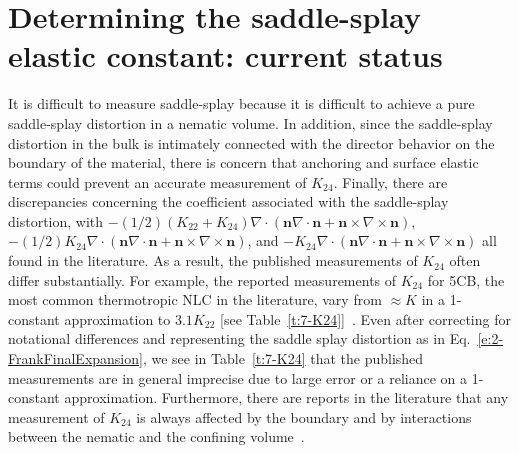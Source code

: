 \section{Determining the saddle-splay elastic constant: current status}
It is difficult to measure saddle-splay because it is difficult to achieve a pure saddle-splay distortion in a nematic volume.
In addition, since the saddle-splay distortion in the bulk is intimately connected with the director behavior on the boundary of the material, there is concern that anchoring and surface elastic terms could prevent an accurate measurement of $K_{24}$.
Finally, there are discrepancies concerning the coefficient associated with the saddle-splay distortion, with
$-(1/2)(K_{22} + K_{24})\nabla \cdot (\mathbf{n}\nabla \cdot \mathbf{n} + \mathbf{n} \times \nabla \times \mathbf{n})$,
$-(1/2)K_{24}\nabla \cdot (\mathbf{n}\nabla \cdot \mathbf{n} + \mathbf{n} \times \nabla \times \mathbf{n})$,
and $-K_{24}\nabla \cdot (\mathbf{n}\nabla \cdot \mathbf{n} + \mathbf{n} \times \nabla \times \mathbf{n})$ all found in the literature.
As a result, the published measurements of $K_{24}$ often differ substantially.
For example, the reported measurements of $K_{24}$ for 5CB, the most common thermotropic NLC in the literature, vary from $\approx K$ in a 1-constant approximation  to $3.1 K_{22}$ [see Table~\ref{t:7-K24}]~\cite{RN24,allender1991determination,polak1994optical,sparavigna1994periodic}.
Even after correcting for notational differences and representing the saddle splay distortion as in Eq.~\ref{e:2-FrankFinalExpansion}, we see in Table~\ref{t:7-K24} that the published measurements are in general imprecise due to large error or a reliance on a 1-constant approximation.
Furthermore, there are reports in the literature that any measurement of $K_{24}$ is always affected by the boundary and by interactions between the nematic and the confining volume~\cite{RN55,RN191,sidky2018silico}.

